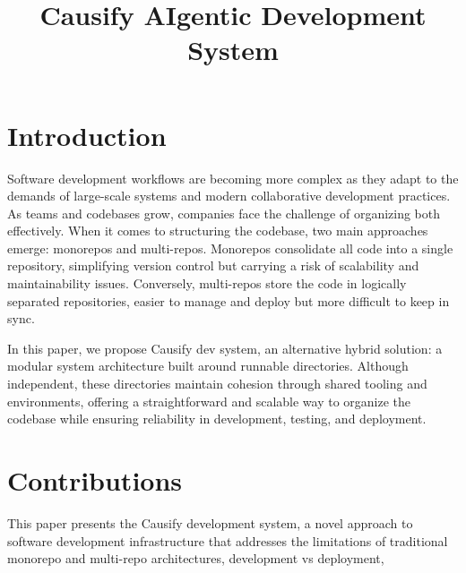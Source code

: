 


\graphicspath{{papers/Causify_AIgentic_Development_System/}}


  \title{Causify AIgentic Development System}
  \maketitle

  \section{Introduction}
  Software development workflows are becoming more complex as they adapt
  to the demands of large-scale systems and modern collaborative
  development practices. As teams and codebases grow, companies face the
  challenge of organizing both effectively. When it comes to structuring
  the codebase, two main approaches emerge: monorepos and multi-repos.
  Monorepos consolidate all code into a single repository, simplifying version
  control but carrying a risk of scalability and maintainability issues.
  Conversely, multi-repos store the code in logically separated repositories,
  easier to manage and deploy but more difficult to keep in sync.

  In this paper, we propose Causify dev system, an alternative hybrid
  solution: a modular system architecture built around runnable directories.
  Although independent, these directories maintain cohesion through shared
  tooling and environments, offering a straightforward and scalable way
  to organize the codebase while ensuring reliability in development, testing,
  and deployment.

  \section{Contributions}

  This paper presents the Causify development system, a novel approach
  to software development infrastructure that addresses the limitations
  of traditional monorepo and multi-repo architectures, development vs deployment,

